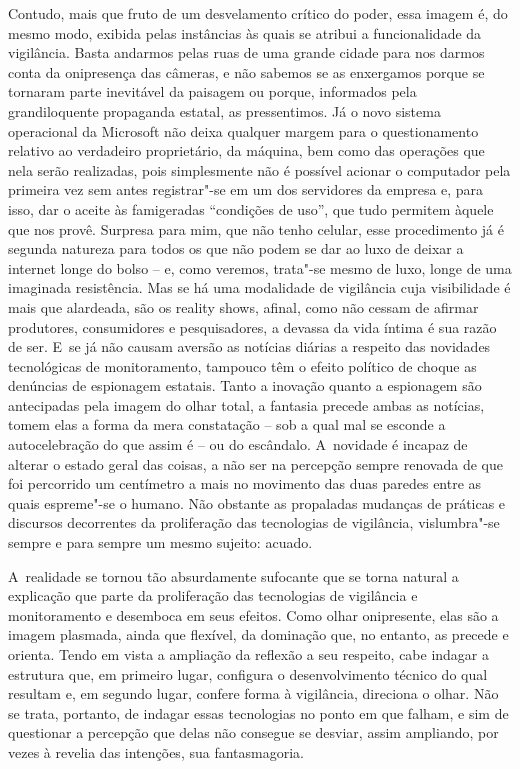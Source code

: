 Contudo, mais que fruto de um desvelamento crítico do poder, essa imagem
é, do mesmo modo, exibida pelas instâncias às quais se atribui a
funcionalidade da vigilância. Basta andarmos pelas ruas de uma grande
cidade para nos darmos conta da onipresença das câmeras, e não sabemos
se as enxergamos porque se tornaram parte inevitável da paisagem ou
porque, informados pela grandiloquente propaganda estatal, as
pressentimos. Já o novo sistema operacional da Microsoft não deixa
qualquer margem para o questionamento relativo ao verdadeiro
proprietário, da máquina, bem como das operações que nela serão
realizadas, pois simplesmente não é possível acionar o computador pela
primeira vez sem antes registrar"-se em um dos servidores da empresa e,
para isso, dar o aceite às famigeradas ``condições de uso'', que tudo
permitem àquele que nos provê. Surpresa para mim, que não tenho celular,
esse procedimento já é segunda natureza para todos os que não podem se
dar ao luxo de deixar a internet longe do bolso -- e, como veremos,
trata"-se mesmo de luxo, longe de uma imaginada resistência. Mas se há
uma modalidade de vigilância cuja visibilidade é mais que alardeada, são
os reality shows, afinal, como não cessam de afirmar produtores,
consumidores e pesquisadores, a devassa da vida íntima é sua razão de
ser. E~se já não causam aversão as notícias diárias a respeito das
novidades tecnológicas de monitoramento, tampouco têm o efeito político
de choque as denúncias de espionagem estatais. Tanto a inovação quanto a
espionagem são antecipadas pela imagem do olhar total, a fantasia
precede ambas as notícias, tomem elas a forma da mera constatação -- sob
a qual mal se esconde a autocelebração do que assim é -- ou do
escândalo. A~novidade é incapaz de alterar o estado geral das coisas, a
não ser na percepção sempre renovada de que foi percorrido um centímetro
a mais no movimento das duas paredes entre as quais espreme"-se o humano.
Não obstante as propaladas mudanças de práticas e discursos decorrentes
da proliferação das tecnologias de vigilância, vislumbra"-se sempre e
para sempre um mesmo sujeito: acuado.

A~realidade se tornou tão absurdamente sufocante que se torna natural a
explicação que parte da proliferação das tecnologias de vigilância e
monitoramento e desemboca em seus efeitos. Como olhar onipresente, elas
são a imagem plasmada, ainda que flexível, da dominação que, no entanto,
as precede e orienta. Tendo em vista a ampliação da reflexão a seu
respeito, cabe indagar a estrutura que, em primeiro lugar, configura o
desenvolvimento técnico do qual resultam e, em segundo lugar, confere
forma à vigilância, direciona o olhar. Não se trata, portanto, de
indagar essas tecnologias no ponto em que falham, e sim de questionar a
percepção que delas não consegue se desviar, assim ampliando, por vezes
à revelia das intenções, sua fantasmagoria. ~

